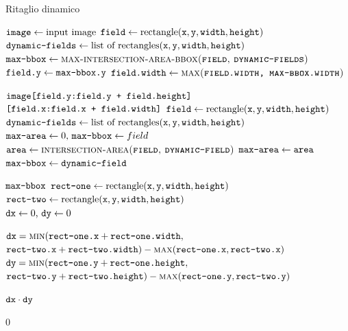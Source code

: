 \begin{algorithm}[H]
	\caption{Ritaglio dinamico}
	\label{alg:dynamic-cut}
	
	\begin{algorithmic}[1]
			\State $\texttt{image} \gets \text{input image}$
			\State $\texttt{field} \gets \text{rectangle} (\texttt{x}, \texttt{y}, \texttt{width}, \texttt{height})$
			\State $\texttt{dynamic-fields} \gets \text{list of rectangles} (\texttt{x}, \texttt{y}, \texttt{width}, \texttt{height})$
			\\
			\State $\vars{max-bbox} \gets \textproc{max-intersection-area-bbox(\vars{field}, \vars{dynamic-fields})}$
			\State $\texttt{field.y} \gets \texttt{max-bbox.y}$
			\State $\vars{field.width} \gets \textproc{max(\vars{field.width, max-bbox.width})}$

			\Return $\texttt{image[field.y:field.y + field.height]}$\newline\hspace*{2.91cm}
					$\texttt{[field.x:field.x + field.width]}$
		\EndFunction
		\Statex
			\State $\texttt{field} \gets \text{rectangle} (\texttt{x}, \texttt{y}, \texttt{width}, \texttt{height})$
			\State $\texttt{dynamic-fields} \gets \text{list of rectangles} (\texttt{x}, \texttt{y}, \texttt{width}, \texttt{height})$
			\\
			\State $\texttt{max-area} \gets 0\text{, } \texttt{max-bbox} \gets field$
				\State $\vars{area} \gets \textproc{intersection-area(\vars{field}, \vars{dynamic-field})}$
					\State $\texttt{max-area} \gets \texttt{area}$
					\State $\texttt{max-bbox} \gets \texttt{dynamic-field}$
				\EndIf
			\EndFor

			\Return $\texttt{max-bbox}$
		\EndFunction
		\Statex
			\State $\texttt{rect-one} \gets \text{rectangle} (\texttt{x}, \texttt{y}, \texttt{width}, \texttt{height})$
			\State $\texttt{rect-two} \gets \text{rectangle} (\texttt{x}, \texttt{y}, \texttt{width}, \texttt{height})$
			\\
			\State $\texttt{dx} \gets 0\text{, } \texttt{dy} \gets 0$
			
			\State $\vars{dx} = \textproc{min}(\vars{rect-one.x} + \vars{rect-one.width},$\newline\hspace*{0.6cm}$\vars{rect-two.x} + \vars{rect-two.width}) - \textproc{max}(\vars{rect-one.x}, \vars{rect-two.x})$
			\State $\vars{dy} = \textproc{min}(\vars{rect-one.y} + \vars{rect-one.height},$\newline\hspace*{0.6cm}$\vars{rect-two.y} + \vars{rect-two.height}) - \textproc{max}(\vars{rect-one.y}, \vars{rect-two.y})$

				\Return $\texttt{dx} \cdot \texttt{dy}$
			\EndIf

			\Return $0$
		\EndFunction
	\end{algorithmic}
\end{algorithm}
